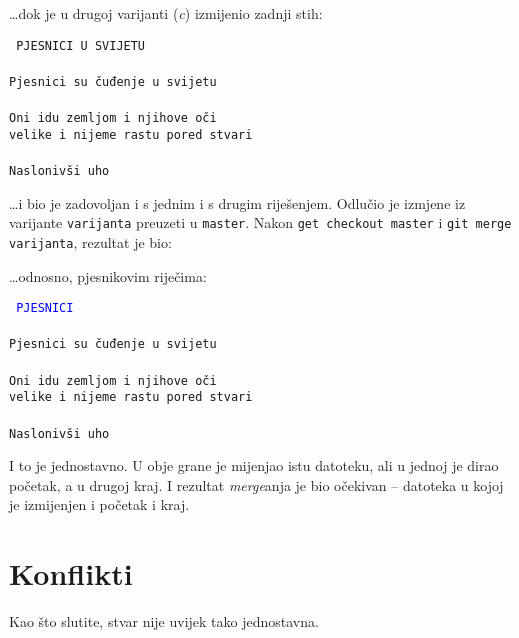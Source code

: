 \dots{}dok je u drugoj varijanti (\emph c) izmijenio zadnji stih:

\vspace{5mm}
\noindent\texttt{%
PJESNICI U SVIJETU\\%
\\%
Pjesnici su čuđenje u svijetu\\%
\\%
Oni idu zemljom i njihove oči\\%
velike i nijeme rastu pored stvari\\%
\\%
Naslonivši uho\\%
\color{blue}{na ćutanje sto ih okružuje i muči\\%
pjesnici su vječno treptanje u svijetu}}
\vspace{5mm}

\dots{}i bio je zadovoljan i s jednim i s drugim riješenjem.
Odlučio je izmjene iz varijante \verb+varijanta+ preuzeti u \verb+master+.
Nakon \verb+get checkout master+ i \verb+git merge varijanta+, rezultat je bio:



\dots{}odnosno, pjesnikovim riječima:

\vspace{5mm}
\noindent\texttt{%
\textcolor{blue}{PJESNICI}\\%
\\%
Pjesnici su čuđenje u svijetu\\%
\\%
Oni idu zemljom i njihove oči\\%
velike i nijeme rastu pored stvari\\%
\\%
Naslonivši uho\\%
\color{blue}{na ćutanje sto ih okružuje i muči\\%
pjesnici su vječno treptanje u svijetu}}
\vspace{5mm}

I to je jednostavno.
U obje grane je mijenjao istu datoteku, ali u jednoj je dirao početak, a u drugoj kraj.
I rezultat \emph{merge}anja je bio očekivan -- datoteka u kojoj je izmijenjen i početak i kraj.

\section*{Konflikti}

Kao što slutite, stvar nije uvijek tako jednostavna.

